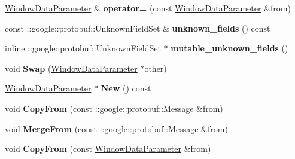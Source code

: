 \begin{DoxyCompactItemize}
\mbox{\hyperlink{classcaffe_1_1_window_data_parameter}{Window\+Data\+Parameter}} \& {\bfseries operator=} (const \mbox{\hyperlink{classcaffe_1_1_window_data_parameter}{Window\+Data\+Parameter}} \&from)
\item 
\mbox{\label{classcaffe_1_1_window_data_parameter_ae62b4157c604a5ac3f3f7e5731960f51}} 
const \+::google\+::protobuf\+::\+Unknown\+Field\+Set \& {\bfseries unknown\+\_\+fields} () const
\item 
\mbox{\label{classcaffe_1_1_window_data_parameter_a5893f671cecf6372697d171b0232eb54}} 
inline \+::google\+::protobuf\+::\+Unknown\+Field\+Set $\ast$ {\bfseries mutable\+\_\+unknown\+\_\+fields} ()
\item 
\mbox{\label{classcaffe_1_1_window_data_parameter_abe7e090a55e32e01b52e090e45e5cc7b}} 
void {\bfseries Swap} (\mbox{\hyperlink{classcaffe_1_1_window_data_parameter}{Window\+Data\+Parameter}} $\ast$other)
\item 
\mbox{\label{classcaffe_1_1_window_data_parameter_a58d0ee4539210b3291fe8ee46b6be76a}} 
\mbox{\hyperlink{classcaffe_1_1_window_data_parameter}{Window\+Data\+Parameter}} $\ast$ {\bfseries New} () const
\item 
\mbox{\label{classcaffe_1_1_window_data_parameter_a8735ec35a747432ac13e5c51f6bc8efd}} 
void {\bfseries Copy\+From} (const \+::google\+::protobuf\+::\+Message \&from)
\item 
\mbox{\label{classcaffe_1_1_window_data_parameter_a465de22fa1b67851094cbfcd3fe3ad9e}} 
void {\bfseries Merge\+From} (const \+::google\+::protobuf\+::\+Message \&from)
\item 
\mbox{\label{classcaffe_1_1_window_data_parameter_a145047f2156f87ca926399743f0912de}} 
void {\bfseries Copy\+From} (const \mbox{\hyperlink{classcaffe_1_1_window_data_parameter}{Window\+Data\+Parameter}} \&from)
\item 
\mbox{\label{classcaffe_1_1_window_data_parameter_ac9b423bfe710f71e1d3458e1e255aa05}} 

\end{DoxyCompactItemize}

